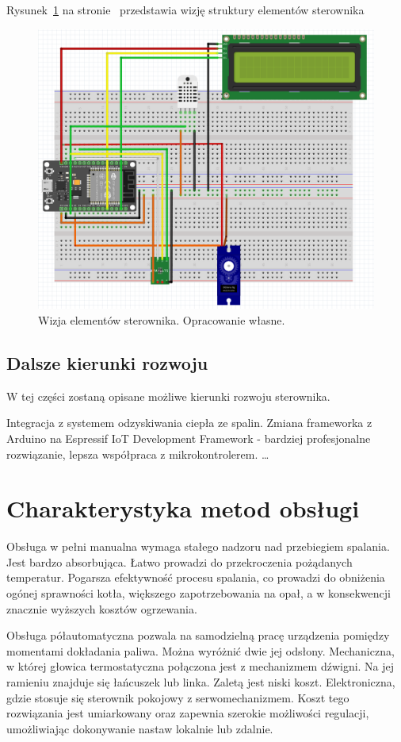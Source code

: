 \documentclass[12pt]{report}
\begin{document}
 Rysunek~\ref{fig:wizja} na stronie~\pageref{fig:wizja} przedstawia wizję struktury elementów sterownika
 \begin{figure}[ht]
\centering
\includegraphics[width=0.8 \textwidth]{fig/fritzing_bredboard_v1.png}
\caption{Wizja elementów sterownika. Opracowanie własne.}
\label{fig:wizja}
\end{figure}
 
 \section{Dalsze kierunki rozwoju}
 W tej części zostaną opisane możliwe kierunki rozwoju sterownika.
 
 Integracja z systemem odzyskiwania ciepła ze spalin.
 Zmiana frameworka z Arduino na Espressif IoT Development Framework - bardziej profesjonalne rozwiązanie, lepsza współpraca z mikrokontrolerem.
 \ldots
 

 \chapter{Charakterystyka metod obsługi} 
 Obsługa w pełni manualna wymaga stałego nadzoru nad przebiegiem spalania. Jest bardzo absorbująca. Łatwo prowadzi do przekroczenia pożądanych temperatur. Pogarsza efektywność procesu spalania, co prowadzi do obniżenia ogónej sprawności kotła, większego zapotrzebowania na opał, a w konsekwencji znacznie wyższych kosztów ogrzewania.
 
 Obsługa półautomatyczna pozwala na samodzielną pracę urządzenia pomiędzy momentami dokładania paliwa. Można wyróżnić dwie jej odsłony. Mechaniczna, w której głowica termostatyczna połączona jest z mechanizmem dźwigni. Na jej ramieniu znajduje się łańcuszek lub linka. Zaletą jest niski koszt. Elektroniczna, gdzie stosuje się sterownik pokojowy z serwomechanizmem. Koszt tego rozwiązania jest umiarkowany oraz zapewnia szerokie możliwości regulacji, umożliwiając dokonywanie nastaw lokalnie lub zdalnie.
 
\end{document}
